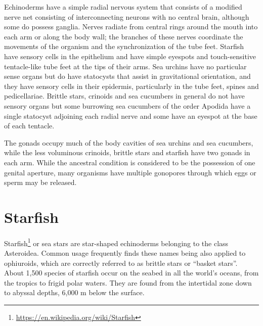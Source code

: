 \documentclass[]{book}
\let\rmarkdownfootnote\footnote%
\def\footnote{\protect\rmarkdownfootnote}
\renewcommand{\href}[2]{#2\footnote{\url{#1}}}
\begin{document}
Echinoderms have a simple radial nervous system that consists of a modified nerve net consisting of interconnecting neurons with no central brain, although some do possess ganglia. Nerves radiate from central rings around the mouth into each arm or along the body wall; the branches of these nerves coordinate the movements of the organism and the synchronization of the tube feet. Starfish have sensory cells in the epithelium and have simple eyespots and touch-sensitive tentacle-like tube feet at the tips of their arms. Sea urchins have no particular sense organs but do have statocysts that assist in gravitational orientation, and they have sensory cells in their epidermis, particularly in the tube feet, spines and pedicellariae. Brittle stars, crinoids and sea cucumbers in general do not have sensory organs but some burrowing sea cucumbers of the order Apodida have a single statocyst adjoining each radial nerve and some have an eyespot at the base of each tentacle.

The gonads occupy much of the body cavities of sea urchins and sea cucumbers, while the less voluminous crinoids, brittle stars and starfish have two gonads in each arm. While the ancestral condition is considered to be the possession of one genital aperture, many organisms have multiple gonopores through which eggs or sperm may be released.

\hypertarget{starfish}{%
\section{Starfish}\label{starfish}}

\href{https://en.wikipedia.org/wiki/Starfish}{Starfish} or sea stars are star-shaped echinoderms belonging to the class Asteroidea. Common usage frequently finds these names being also applied to ophiuroids, which are correctly referred to as brittle stars or ``basket stars''. About 1,500 species of starfish occur on the seabed in all the world's oceans, from the tropics to frigid polar waters. They are found from the intertidal zone down to abyssal depths, 6,000 m below the surface.
\end{document}
